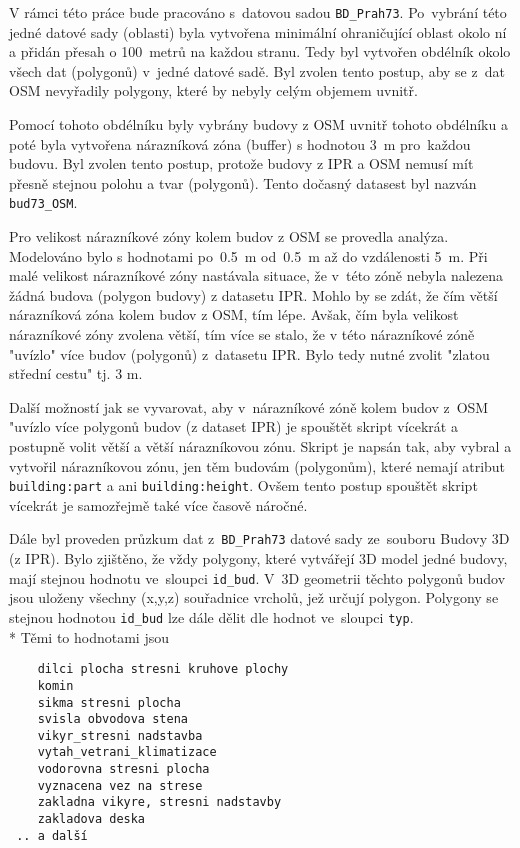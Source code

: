V rámci této práce bude pracováno s~datovou sadou
{\tt BD\_Prah73}. Po~vybrání této jedné datové sady (oblasti) byla
vytvořena minimální ohraničující oblast okolo ní a přidán přesah o
100~metrů na každou stranu. Tedy byl vytvořen obdélník okolo všech dat
(polygonů) v~jedné datové sadě. Byl zvolen tento postup, aby se z~dat
OSM nevyřadily polygony, které by nebyly celým objemem uvnitř.

Pomocí tohoto obdélníku byly vybrány budovy z OSM uvnitř tohoto
obdélníku a poté byla vytvořena nárazníková zóna (buffer) s hodnotou
3~m pro~každou budovu. Byl zvolen tento postup, protože budovy z IPR a
OSM nemusí mít přesně stejnou polohu a tvar (polygonů). Tento dočasný
datasest byl nazván {\tt bud73\_OSM}.

Pro velikost nárazníkové zóny kolem budov z OSM se provedla analýza.
Modelováno bylo s hodnotami po~0.5~m od~0.5~m až do vzdálenosti 5~m.
Při malé velikost nárazníkové zóny nastávala situace, že v~této zóně
nebyla nalezena žádná budova (polygon budovy) z datasetu IPR. Mohlo by
se zdát, že čím větší nárazníková zóna kolem budov z OSM, tím lépe.
Avšak, čím byla velikost nárazníkové zóny zvolena větší, tím více se
stalo, že v této nárazníkové zóně "uvízlo" více budov (polygonů)
z~datasetu IPR. Bylo tedy nutné zvolit "zlatou střední cestu" tj. 3 m.

Další možností jak se vyvarovat, aby v~nárazníkové zóně kolem budov
z~OSM "uvízlo více polygonů budov (z dataset IPR) je spouštět skript
vícekrát a postupně volit větší a větší nárazníkovou zónu. Skript je
napsán tak, aby vybral a vytvořil nárazníkovou zónu, jen těm budovám
(polygonům), které nemají atribut {\tt building:part} a ani
{\tt building:height}. Ovšem tento postup spouštět skript vícekrát je
samozřejmě také více časově náročné.

Dále byl proveden průzkum dat z~{\tt BD\_Prah73} datové sady
ze~souboru Budovy 3D (z IPR). Bylo zjištěno, že vždy polygony, které
vytvářejí 3D model jedné budovy, mají stejnou hodnotu ve~sloupci
{\tt id\_bud}. V~3D geometrii těchto polygonů budov jsou uloženy
všechny (x,y,z) souřadnice vrcholů, jež určují polygon. Polygony se
stejnou hodnotou {\tt id\_bud} lze dále dělit dle hodnot
ve~sloupci {\tt typ}.
\\*
Těmi to hodnotami jsou
\begin{verbatim}
    dilci plocha stresni kruhove plochy
    komin
    sikma stresni plocha
    svisla obvodova stena
    vikyr_stresni nadstavba
    vytah_vetrani_klimatizace
    vodorovna stresni plocha
    vyznacena vez na strese
    zakladna vikyre, stresni nadstavby
    zakladova deska
 .. a další
\end{verbatim}

